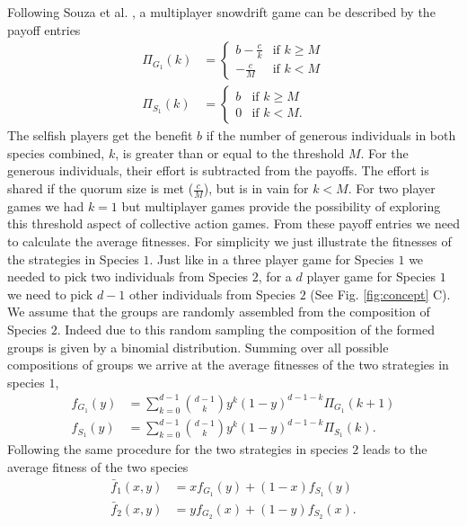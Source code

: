 \documentclass[12pt]{article}
\begin{document}
Following Souza et al. \cite{souza:JTB:2009},  
a multiplayer snowdrift game can be described by the payoff entries
\begin{align}
\Pi_{G_1} (k) & = \begin{cases} b-\frac{c}{k} & \textrm{if } k \geq M \\  -\frac{c}{M} & \textrm{if } k < M \end{cases}
\\
\Pi_{S_1} (k) & = \begin{cases} b & \textrm{if } k \geq M \\ 0 & \textrm{if } k < M. \end{cases}
\end{align}
%
The selfish players get the benefit $b$ if the number of generous individuals in both species combined, $k$, is greater than or equal to the threshold $M$.
For the generous individuals, their effort is subtracted from the payoffs.
The effort is shared if the quorum size is met ($\frac{c}{M}$), but is in vain for $k<M$.
For two player games we had $k=1$ but multiplayer games provide the possibility of exploring this threshold aspect of collective action games.
From these payoff entries we need to calculate the average fitnesses.
For simplicity we just illustrate the fitnesses of the strategies in Species $1$.
Just like in a three player game for Species $1$ we needed to pick two individuals from Species $2$, for a $d$ player game for Species $1$ we need to pick $d-1$ other individuals from Species $2$ (See Fig. \ref{fig:concept} C).
We assume that the groups are randomly assembled from the composition of Species $2$.
Indeed due to this random sampling the composition of the formed groups is given by a binomial distribution.
Summing over all possible compositions of groups we arrive at  the average fitnesses of the two strategies in species $1$,
%
\begin{align}
f_{G_1} (y) &= \sum_{k=0}^{d-1} \binom{d-1}{k}y^k (1-y)^{d-1-k} \Pi_{G_1}(k+1) \\
f_{S_1} (y) &= \sum_{k=0}^{d-1} \binom{d-1}{k}y^k (1-y)^{d-1-k} \Pi_{S_1}(k).
\label{fiteqs}
\end{align}
%
Following the same procedure for the two strategies in species $2$ leads to the average fitness of the two species
%
\begin{align}
\bar{f}_1 (x,y) &= x f_{G_1} (y)+(1-x) f_ {S_1}(y)\\
\bar{f}_2 (x,y) &= y f_{G_2} (x)+(1-y) f_{S_2}(x).
\label{avgfiteqs}
\end{align}
%
\end{document}
